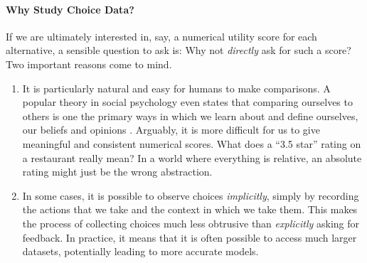 \paragraph{Why Study Choice Data?}
If we are ultimately interested in, say, a numerical utility score for each alternative, a sensible question to ask is:
Why not \emph{directly} ask for such a score?
Two important reasons come to mind.
\begin{enumerate}
\item It is particularly natural and easy for humans to make comparisons.
A popular theory in social psychology even states that comparing ourselves to others is one the primary ways in which we learn about and define ourselves, our beliefs and opinions \citep{festinger1954theory}.
Arguably, it is more difficult for us to give meaningful and consistent numerical scores.
What does a ``3.5 star'' rating on a restaurant really mean?
In a world where everything is relative, an absolute rating might just be the wrong abstraction.

\item In some cases, it is possible to observe choices \emph{implicitly}, simply by recording the actions that we take and the context in which we take them.
This makes the process of collecting choices much less obtrusive than \emph{explicitly} asking for feedback.
In practice, it means that it is often possible to access much larger datasets, potentially leading to more accurate models.
\end{enumerate}

